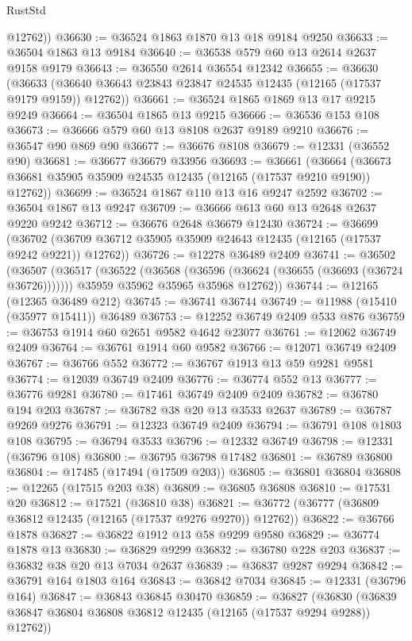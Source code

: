 \begin{lexlean}{RustStd}
\begin{coremodule}
        @12762))
@36630 := @36524 @1863 @1870 @13 @18 @9184 @9250
@36633 := @36504 @1863 @13 @9184
@36640 := @36538 @579 @60 @13 @2614 @2637 @9158 @9179
@36643 := @36550 @2614 @36554 @12342
@36655 := @36630
    (@36633 (@36640 @36643 @23843 @23847 @24535 @12435 (@12165 (@17537 @9179 @9159)) @12762))
@36661 := @36524 @1865 @1869 @13 @17 @9215 @9249
@36664 := @36504 @1865 @13 @9215
@36666 := @36536 @153 @108
@36673 := @36666 @579 @60 @13 @8108 @2637 @9189 @9210
@36676 := @36547 @90 @869 @90
@36677 := @36676 @8108
@36679 := @12331 (@36552 @90)
@36681 := @36677 @36679 @33956
@36693 := @36661
    (@36664 (@36673 @36681 @35905 @35909 @24535 @12435 (@12165 (@17537 @9210 @9190)) @12762))
@36699 := @36524 @1867 @110 @13 @16 @9247 @2592
@36702 := @36504 @1867 @13 @9247
@36709 := @36666 @613 @60 @13 @2648 @2637 @9220 @9242
@36712 := @36676 @2648 @36679 @12430
@36724 := @36699
    (@36702 (@36709 @36712 @35905 @35909 @24643 @12435 (@12165 (@17537 @9242 @9221)) @12762))
@36726 := @12278 @36489 @2409
@36741 := @36502
    (@36507
      (@36517
        (@36522 (@36568 (@36596 (@36624 (@36655 (@36693 (@36724 @36726)))))))
        @35959
        @35962
        @35965
        @35968
        @12762))
@36744 := @12165 (@12365 @36489 @212)
@36745 := @36741 @36744
@36749 := @11988 (@15410 (@35977 @15411)) @36489
@36753 := @12252 @36749 @2409 @533 @876
@36759 := @36753 @1914 @60 @2651 @9582 @4642 @23077
@36761 := @12062 @36749 @2409
@36764 := @36761 @1914 @60 @9582
@36766 := @12071 @36749 @2409
@36767 := @36766 @552
@36772 := @36767 @1913 @13 @59 @9281 @9581
@36774 := @12039 @36749 @2409
@36776 := @36774 @552 @13
@36777 := @36776 @9281
@36780 := @17461 @36749 @2409 @2409
@36782 := @36780 @194 @203
@36787 := @36782 @38 @20 @13 @3533 @2637
@36789 := @36787 @9269 @9276
@36791 := @12323 @36749 @2409
@36794 := @36791 @108 @1803 @108
@36795 := @36794 @3533
@36796 := @12332 @36749
@36798 := @12331 (@36796 @108)
@36800 := @36795 @36798 @17482
@36801 := @36789 @36800
@36804 := @17485 (@17494 (@17509 @203))
@36805 := @36801 @36804
@36808 := @12265 (@17515 @203 @38)
@36809 := @36805 @36808
@36810 := @17531 @20
@36812 := @17521 (@36810 @38)
@36821 := @36772 (@36777 (@36809 @36812 @12435 (@12165 (@17537 @9276 @9270)) @12762))
@36822 := @36766 @1878
@36827 := @36822 @1912 @13 @58 @9299 @9580
@36829 := @36774 @1878 @13
@36830 := @36829 @9299
@36832 := @36780 @228 @203
@36837 := @36832 @38 @20 @13 @7034 @2637
@36839 := @36837 @9287 @9294
@36842 := @36791 @164 @1803 @164
@36843 := @36842 @7034
@36845 := @12331 (@36796 @164)
@36847 := @36843 @36845 @30470
@36859 := @36827
    (@36830 (@36839 @36847 @36804 @36808 @36812 @12435 (@12165 (@17537 @9294 @9288)) @12762))

\end{coremodule}
\end{lexlean}
